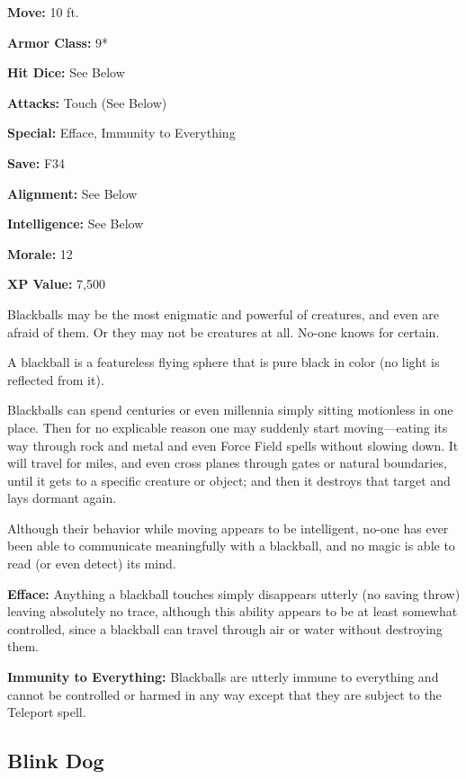 \begin{multicols*}{2}
{\textbf{Move:} 10 ft.

\textbf{Armor Class:} 9*

\textbf{Hit Dice:} See Below

\textbf{Attacks:} Touch (See Below)

\textbf{Special:} Efface, Immunity to Everything

\textbf{Save:} F34

\textbf{Alignment:} See Below

\textbf{Intelligence:} See Below

\textbf{Morale:} 12

\textbf{XP Value:} 7,500}

Blackballs may be the most enigmatic and powerful of creatures, and even  are afraid of them. Or they may not be creatures at all. No-one knows for certain.

A blackball is a featureless flying sphere that is pure black in color (no light is reflected from it).

Blackballs can spend centuries or even millennia simply sitting motionless in one place. Then for no explicable reason one may suddenly start moving—eating its way through rock and metal and even Force Field spells without slowing down. It will travel for miles, and even cross planes through gates or natural boundaries, until it gets to a specific creature or object; and then it destroys that target and lays dormant again.

Although their behavior while moving appears to be intelligent, no-one has ever been able to communicate meaningfully with a blackball, and no magic is able to read (or even detect) its mind.

\textbf{Efface:} Anything a blackball touches simply disappears utterly (no saving throw) leaving absolutely no trace, although this ability appears to be at least somewhat controlled, since a blackball can travel through air or water without destroying them.

\textbf{Immunity to Everything:} Blackballs are utterly immune to everything and cannot be controlled or harmed in any way except that they are subject to the Teleport spell.

\subsection{Blink Dog}
\end{multicols*}
